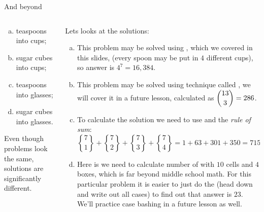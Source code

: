 \documentclass[9pt,aspectratio=169]{beamer}
\newcommand{\genstirlingII}[3]{%
  \genfrac{\{}{\}}{0pt}{#1}{#2}{#3}%
}
\newcommand{\stirlingII}[2]{\genstirlingII{}{#1}{#2}}
\begin{document}
\begin{frame}{And beyond}
\begin{columns}[T]
\begin{column}{0.5\textwidth}
\begin{problem}
        \begin{enumerate}[a)]
          \item teaspoons into cups;
          \item sugar cubes into cups;
          \item teaspoons into glasses;
          \item sugar cubes into glasses.
        \end{enumerate}
      \end{problem}
      \begin{figure}\end{figure}
      Even though problems look the same, solutions are significantly different.
    \end{column}
    \begin{column}{0.5\textwidth}
      {\small
      Lets looks at the solutions:
      \begin{enumerate}[a)]
        \item This problem may be solved using , which we covered in this slides, (every spoon may be put in $4$ different cups), so answer is $4^7 = 16,384$.
        \item This problem may be solved using technique called , we will cover it in a future lesson, calculated as $\dbinom{13}{3} = 286$.
        \item To calculate the solution we need to use  and the \emph{rule of sum}:
        \[ \stirlingII{7}{1}+\stirlingII{7}{2}+\stirlingII{7}{3}+\stirlingII{7}{4}=1+63+301+350=715. \]\vspace*{-1ex}
        \item Here is we need to calculate number of  with $10$ cells and $4$ boxes, which is far beyond middle school math. For this particular problem it is easier to just do the  (head down and write out all cases) to find out that answer is $23$.  We’ll practice case bashing in a future lesson as well.
      \end{enumerate}
      }
    \end{column}
  \end{columns}
\end{frame}
\end{document}
